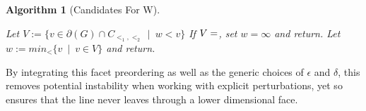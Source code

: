 \documentclass[12pt,a4paper]{report}
\newtheorem{algorithm}{Algorithm}
\begin{document}
\begin{algorithm}[Candidates For W]\
 \begin{algorithmic}[1]
    \STATE Let $V := \{ v \in \partial (G) \cap C_{{<_{1}, <_{2}}} \: \mid \: w < v \}$
    \STATE If $V = \empty$, set $w = \infty$ and return.
    \STATE Let $w := min_{<} \{ v \: \mid \: v \in V \}$ and return.
\end{algorithmic}
\end{algorithm}


By integrating this facet preordering as well as the generic choices of $\epsilon$ and $\delta$, this removes potential instability when working with explicit perturbations, yet so ensures that the line never leaves through a lower dimensional face.
\end{document}
